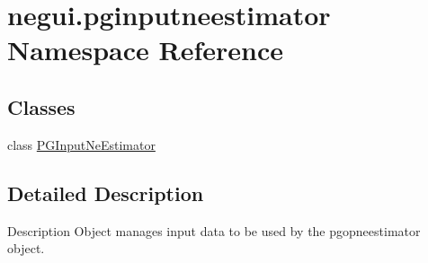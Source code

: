 \hypertarget{namespacenegui_1_1pginputneestimator}{}\section{negui.\+pginputneestimator Namespace Reference}
\label{namespacenegui_1_1pginputneestimator}
\subsection*{Classes}
\begin{DoxyCompactItemize}
\item 
class \hyperlink{classnegui_1_1pginputneestimator_1_1PGInputNeEstimator}{P\+G\+Input\+Ne\+Estimator}
\end{DoxyCompactItemize}


\subsection{Detailed Description}
\begin{DoxyVerb}Description
Object manages input data to be used by the pgopneestimator object.
\end{DoxyVerb}
 